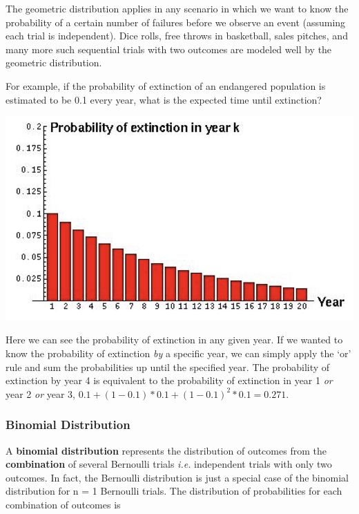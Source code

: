 \documentclass[]{book}
\begin{document}
The geometric distribution applies in any scenario in which we want to know the probability of a certain number of failures before we observe an event (assuming each trial is independent). Dice rolls, free throws in basketball, sales pitches, and many more such sequential trials with two outcomes are modeled well by the geometric distribution.

For example, if the probability of extinction of an endangered population is estimated to be 0.1 every year, what is the expected time until extinction?

\begin{center}\includegraphics[width=0.8\linewidth]{images/prob.017} \end{center}

Here we can see the probability of extinction in any given year. If we wanted to know the probability of extinction \emph{by} a specific year, we can simply apply the `or' rule and sum the probabilities up until the specified year. The probability of extinction by year 4 is equivalent to the probability of extinction in year 1 \emph{or} year 2 \emph{or} year 3, \(0.1 + (1 - 0.1)*0.1 + (1 - 0.1)^2*0.1 = 0.271\).

\hypertarget{binomial-distribution}{%
\subsubsection{\texorpdfstring{\textbf{Binomial Distribution}}{Binomial Distribution}}\label{binomial-distribution}}

A \textbf{binomial distribution} represents the distribution of outcomes from the \textbf{combination} of several Bernoulli trials \emph{i.e.} independent trials with only two outcomes. In fact, the Bernoulli distribution is just a special case of the binomial distribution for n = 1 Bernoulli trials. The distribution of probabilities for each combination of outcomes is
\end{document}
